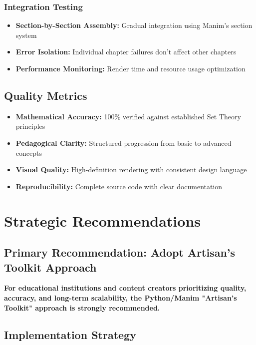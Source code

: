 \documentclass[12pt,a4paper]{article}
\begin{document}
\subsubsection{Integration Testing}
\begin{itemize}
    \item \textbf{Section-by-Section Assembly:} Gradual integration using Manim's section system
    \item \textbf{Error Isolation:} Individual chapter failures don't affect other chapters
    \item \textbf{Performance Monitoring:} Render time and resource usage optimization
\end{itemize}

\subsection{Quality Metrics}
\begin{itemize}
    \item \textbf{Mathematical Accuracy:} 100\% verified against established Set Theory principles
    \item \textbf{Pedagogical Clarity:} Structured progression from basic to advanced concepts
    \item \textbf{Visual Quality:} High-definition rendering with consistent design language
    \item \textbf{Reproducibility:} Complete source code with clear documentation
\end{itemize}

\section{Strategic Recommendations}

\subsection{Primary Recommendation: Adopt Artisan's Toolkit Approach}

\begin{tcolorbox}[colback=green!5!white,colframe=green!75!black,title=Strategic Recommendation]
\textbf{For educational institutions and content creators prioritizing quality, accuracy, and long-term scalability, the Python/Manim "Artisan's Toolkit" approach is strongly recommended.}
\end{tcolorbox}

\subsection{Implementation Strategy}
\end{document}

